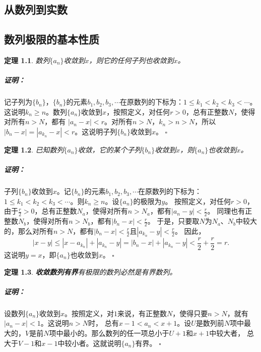 \documentclass[12pt,UTF8]{ctexbook}
\newtheorem{tm}{定理}[section]
\renewenvironment{proof}{\paragraph{\textbf{证明：}}}{\hfill$\square$}
\begin{document}
\begin{appendix}

\chapter{从数列到实数}
\section{数列极限的基本性质}

\begin{tm}\label{tm:a-0-10}
    数列$\{a_n\}$收敛到$x$，则它的任何子列也收敛到$x$。
\end{tm}
\begin{proof}
    记子列为$\{b_n\}$，$\{b_n\}$的元素$b_1,b_2,b_3,\cdots$在原数列的下标为：$1\leqslant k_1<k_2<k_3<\cdots$。
    这说明$k_n \geqslant n$。数列$\{a_n\}$收敛到$x$，按照定义，对任何$r>0$，总有正整数$N$，使得对所有$n>N$，都有
    $ |a_n - x| < r$。对所有$n>N$，$k_n>n>N$，所以$|b_n - x| = |a_{k_n} - x| < r$。这说明子列$\{b_n\}$收敛到$x$。
\end{proof}

\begin{tm}\label{tm:a-0-20}
    已知数列$\{a_n\}$收敛，它的某个子列$\{b_n\}$收敛到$x$，则$\{a_n\}$也收敛到$x$。
 \end{tm}
\begin{proof}
    子列$\{b_n\}$收敛到$x$。记$\{b_n\}$的元素$b_1,b_2,b_3,\cdots$在原数列的下标为：
    $1\leqslant k_1<k_2<k_3<\cdots$。则$k_n \geqslant n$。设$\{a_n\}$的极限为$y$。
    按照定义，对任何$r>0$，由于$\frac{r}{2} > 0$，总有正整数$N_a$，使得对所有$n>N_a$，都有$ |a_n - y| < \frac{r}{2}$。
    同理也有正整数$N_b$，使得对所有$n>N_b$，都有$ |b_n - x| < \frac{r}{2}$。
    于是，只要取$N$为$N_a$、$N_b$中较大的，那么对所有$n>N$，都有$|b_n - x| < \frac{r}{2}$且$ |a_{k_n} - y| < \frac{r}{2}$。
    因此，
    $$|x - y| \leqslant |x - a_{k_n}| + |a_{k_n} - y| = |b_n - x| + |a_{k_n} - y| < \frac{r}{2} + \frac{r}{2} = r. $$
    这说明$y = x$，即$\{a_n\}$也收敛到$x$。
\end{proof}

\begin{tm}{\textbf{收敛数列有界}}\label{tm:a-0-30}
    有极限的数列必然是有界数列。
\end{tm}
\begin{proof}
    设数列$\{a_n\}$收敛到$x$。按照定义，对$1$来说，有正整数$N$，使得只要$n>N$，就有$|a_n - x| < 1$。这说明$n>N$时，
    总有$x - 1 < a_n < x + 1$。设$U$是数列前$N$项中最大的，$V$是前$N$项中最小的。那么数列的任一项总小于$U+1$和$x+1$中较大者，
    总大于$V-1$和$x-1$中较小者。这就说明$\{a_n\}$有界。
\end{proof}


\end{appendix}
\end{document}
